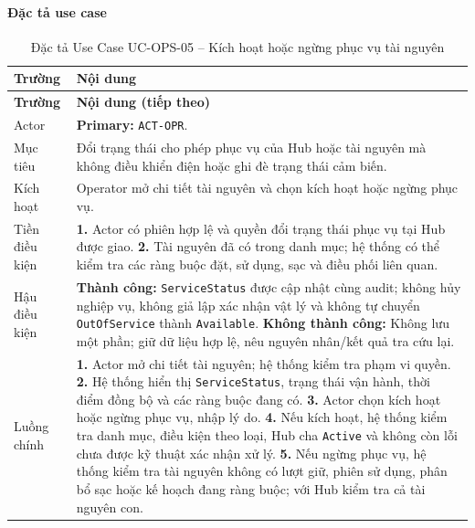 \paragraph{Đặc tả use case}
\small
\begin{longtable}{|L{26mm}|L{118mm}|}
  \caption{Đặc tả Use Case UC-OPS-05 -- Kích hoạt hoặc ngừng phục vụ tài nguyên}\label{tab:spec-UC-OPS-05}\\
  \hline
  \textbf{Trường} & \textbf{Nội dung}\\\hline
  \endfirsthead
  \hline
  \textbf{Trường} & \textbf{Nội dung (tiếp theo)}\\\hline
  \endhead
  Actor & \textbf{Primary:} \texttt{ACT-OPR}.\\\hline
  Mục tiêu & Đổi trạng thái cho phép phục vụ của Hub hoặc tài nguyên mà không điều khiển điện hoặc ghi đè trạng thái cảm biến.\\\hline
  Kích hoạt & Operator mở chi tiết tài nguyên và chọn kích hoạt hoặc ngừng phục vụ.\\\hline
  Tiền điều kiện & \textbf{1.} Actor có phiên hợp lệ và quyền đổi trạng thái phục vụ tại Hub được giao.\newline
\textbf{2.} Tài nguyên đã có trong danh mục; hệ thống có thể kiểm tra các ràng buộc đặt, sử dụng, sạc và điều phối liên quan.\\\hline
  Hậu điều kiện & \textbf{Thành công:} \texttt{ServiceStatus} được cập nhật cùng audit; không hủy nghiệp vụ, không giả lập xác nhận vật lý và không tự chuyển \texttt{OutOfService} thành \texttt{Available}.\newline
  \textbf{Không thành công:} Không lưu một phần; giữ dữ liệu hợp lệ, nêu nguyên nhân/kết quả tra cứu lại.\\\hline
  Luồng chính & \textbf{1.} Actor mở chi tiết tài nguyên; hệ thống kiểm tra phạm vi quyền.\newline
\textbf{2.} Hệ thống hiển thị \texttt{ServiceStatus}, trạng thái vận hành, thời điểm đồng bộ và các ràng buộc đang có.\newline
\textbf{3.} Actor chọn kích hoạt hoặc ngừng phục vụ, nhập lý do.\newline
\textbf{4.} Nếu kích hoạt, hệ thống kiểm tra danh mục, điều kiện theo loại, Hub cha \texttt{Active} và không còn lỗi chưa được kỹ thuật xác nhận xử lý.\newline
\textbf{5.} Nếu ngừng phục vụ, hệ thống kiểm tra tài nguyên không có lượt giữ, phiên sử dụng, phân bổ sạc hoặc kế hoạch đang ràng buộc; với Hub kiểm tra cả tài nguyên con.\newline

\end{longtable}
